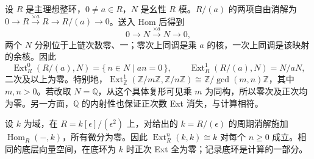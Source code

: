 \begin{example}\label{b4:exm:ext-cyclic}
	设 \(R\) 是主理想整环，\(0\ne a\in R\)，\(N\) 是幺性 \(R\) 模。\(R/(a)\) 的两项自由消解为 \(0\to R\xrightarrow{\times a}R\to R/(a)\to0\)。送入 Hom 后得到
	\[
		0\longrightarrow N\xrightarrow{\times a}N\longrightarrow0,
	\]
	两个 \(N\) 分别位于上链次数零、一；零次上同调是乘 \(a\) 的核，一次上同调是该映射的余核。因此
	\[
		\operatorname{Ext}_R^0(R/(a),N)=\{\,n\in N\mid an=0\,\}, \qquad\operatorname{Ext}_R^1(R/(a),N)=N/aN,
	\]
	二次及以上为零。特别地，\(\operatorname{Ext}_{\mathbb Z}^1(\mathbb Z/m\mathbb Z,\mathbb Z/n\mathbb Z)\cong\mathbb Z/\gcd(m,n)\mathbb Z\)，其中 \(m,n>0\)。若改取 \(N=\mathbb Q\)，从这个具体复形可见乘 \(m\) 为同构，所以零次及正次均为零。另一方面，\(\mathbb Q\) 的内射性也保证正次数 Ext 消失，与计算相符。
\end{example}

设 \(k\) 为域，在 \(R=k[\epsilon]/(\epsilon^2)\) 上，对给出的 \(k=R/(\epsilon)\) 的周期消解施加 \(\operatorname{Hom}_R(-,k)\)，所有微分为零。因此 \(\operatorname{Ext}_R^n(k,k)\cong k\) 对每个 \(n\ge0\) 成立。相同的底层向量空间，在底环为 \(k\) 时正次 Ext 全为零；记录底环是计算的一部分。
